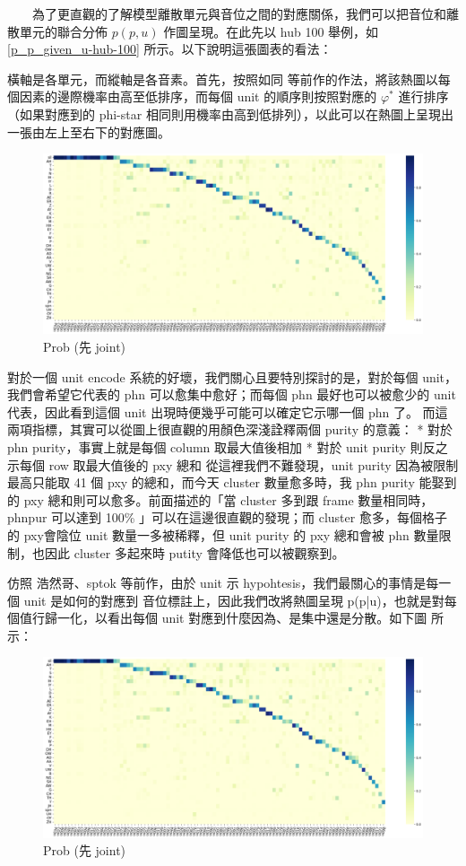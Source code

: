 　　為了更直觀的了解模型離散單元與音位之間的對應關係，我們可以把音位和離散單元的聯合分佈 \(p(p, u)\) 作圖呈現。在此先以 hub 100 舉例，如 \ref{p_p_given_u-hub-100} 所示。以下說明這張圖表的看法：

        橫軸是各單元，而縱軸是各音素。首先，按照如同  等前作的作法，將該熱圖以每個因素的邊際機率由高至低排序，而每個 unit 的順序則按照對應的 $\varphi^\ast$ 進行排序（如果對應到的 phi-star 相同則用機率由高到低排列），以此可以在熱圖上呈現出一張由左上至右下的對應圖。

{
\begin{figure}
    \centering
    \includegraphics[width=0.75\linewidth]{figures/byprob.png}
    \caption{Prob (先 joint)}
    \label{fig:prob}
\end{figure}
}

        對於一個 unit encode 系統的好壞，我們關心且要特別探討的是，對於每個 unit，我們會希望它代表的 phn 可以愈集中愈好；而每個 phn 最好也可以被愈少的 unit 代表，因此看到這個 unit 出現時便幾乎可能可以確定它示哪一個 phn 了。
        而這兩項指標，其實可以從圖上很直觀的用顏色深淺詮釋兩個 purity 的意義：
        * 對於 phn purity，事實上就是每個 column 取最大值後相加
        * 對於 unit purity 則反之示每個 row 取最大值後的 pxy 總和
        從這裡我們不難發現，unit purity 因為被限制最高只能取 41 個 pxy 的總和，而今天 cluster 數量愈多時，我 phn purity 能娶到的 pxy 總和則可以愈多。前面描述的「當 cluster 多到跟 frame 數量相同時，phnpur 可以達到 100\% 」可以在這邊很直觀的發現；而 cluster 愈多，每個格子的 pxy會陰位 unit 數量一多被稀釋，但 unit purity 的 pxy 總和會被 phn 數量限制，也因此 cluster 多起來時 putity 會降低也可以被觀察到。

        仿照 浩然哥、sptok 等前作，由於 unit 示 hypohtesis，我們最關心的事情是每一個 unit 是如何的對應到 音位標註上，因此我們改將熱圖呈現 p(p|u)，也就是對每個值行歸一化，以看出每個 unit 對應到什麼因為、是集中還是分散。如下圖  所示：


{
\begin{figure}
    \centering
    \includegraphics[width=0.75\linewidth]{figures/byprob.png}
    \caption{Prob (先 joint)}
    \label{fig:prob}
\end{figure}
}

